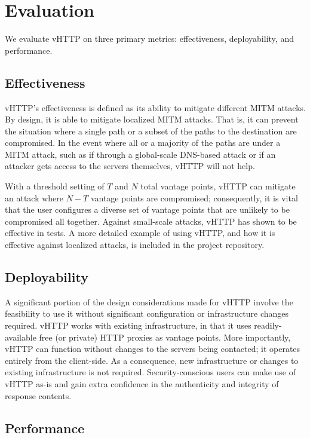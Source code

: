 \section{Evaluation}
\label{sec:eval}

We evaluate vHTTP on three primary metrics: effectiveness, deployability, and
performance.

\subsection{Effectiveness}

vHTTP's effectiveness is defined as its ability to mitigate different MITM
attacks. By design, it is able to mitigate localized MITM attacks. That is, it
can prevent the situation where a single path or a subset of the paths to the
destination are compromised. In the event where all or a majority of the paths
are under a MITM attack, such as if through a global-scale DNS-based attack or
if an attacker gets access to the servers themselves, vHTTP will not help.

With a threshold setting of $T$ and $N$ total vantage points, vHTTP can
mitigate an attack where $N-T$ vantage points are compromised; consequently,
it is vital that the user configures a diverse set of vantage points that are
unlikely to be compromised all together. Against small-scale attacks, vHTTP
has shown to be effective in tests. A more detailed example of using vHTTP,
and how it is effective against localized attacks, is included in the project
repository.

\subsection{Deployability}

A significant portion of the design considerations made for vHTTP involve the
feasibility to use it without significant configuration or infrastructure
changes required. vHTTP works with existing infrastructure, in that it uses
readily-available free (or private) HTTP proxies as vantage points. More
importantly, vHTTP can function without changes to the servers being contacted;
it operates entirely from the client-side. As a consequence, new infrastructure
or changes to existing infrastructure is not required. Security-conscious users
can make use of vHTTP as-is and gain extra confidence in the authenticity and
integrity of response contents.

\subsection{Performance}

